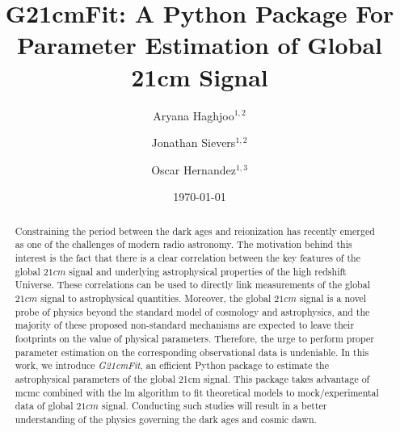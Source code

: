 \documentclass[%
 reprint,
 amsmath,amssymb,
 aps,
]{revtex4-2}
\begin{document}

\title{G21cmFit: A Python Package For Parameter Estimation of Global 21cm Signal}

\author{Aryana Haghjoo$^{1,2}$}
\author{Jonathan Sievers$^{1,2}$}%
\author{Oscar Hernandez$^{1,3}$}
%

\date{\today}%

\begin{abstract} 
Constraining the period between the dark ages and reionization has recently emerged as one of the challenges of modern radio astronomy. The motivation behind this interest is the fact that there is a clear correlation between the key features of the global $21cm$ signal and underlying astrophysical properties of the high redshift Universe. These correlations can be used to directly link measurements of the global $21cm$ signal to astrophysical quantities. Moreover, the global $21cm$ signal is a novel probe of physics beyond the standard model of cosmology and astrophysics, and the majority of these proposed non-standard mechanisms are expected to leave their footprints on the value of physical parameters. Therefore, the urge to perform proper parameter estimation on the corresponding observational data is undeniable. In this work, we introduce \emph{G21cmFit}, an efficient Python package to estimate the astrophysical parameters of the global 21cm signal. This package takes advantage of \gls{mcmc} combined with the \gls{lm} algorithm to fit theoretical models to mock/experimental data of global $21cm$ signal. Conducting such studies will result in a better understanding of the physics governing the dark ages and cosmic dawn.
\end{abstract}

\maketitle
\end{document}
